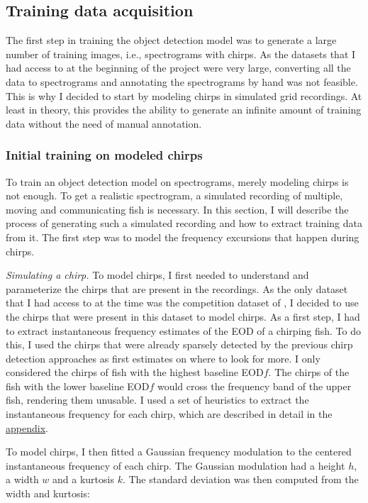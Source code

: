 \subsection{Training data acquisition}
\label{sec:dettraindata}

The first step in training the object detection model was to generate a large
number of training images, i.e., spectrograms with chirps. As the datasets that
I had access to at the beginning of the project were very large, converting all
the data to spectrograms and annotating the spectrograms by hand was not
feasible. This is why I decided to start by modeling chirps in simulated grid
recordings. At least in theory, this provides the ability to generate an
infinite amount of training data without the need of manual annotation.

\subsubsection{Initial training on modeled chirps}

To train an object detection model on spectrograms, merely modeling chirps is
not enough. To get a realistic spectrogram, a simulated recording of multiple,
moving and communicating fish is necessary. In this section, I will describe
the process of generating such a simulated recording and how to extract
training data from it. The first step was to model the frequency excursions
that happen during chirps.

\emph{Simulating a chirp.} To model chirps, I first needed to understand and
parameterize the chirps that are present in the recordings. As the only dataset
that I had access to at the time was the competition dataset of
\textcite{raabElectrocommunicationSignalsIndicate2021}, I decided to use the
chirps that were present in this dataset to model chirps. As a first step, I
had to extract instantaneous frequency estimates of the EOD of a chirping fish.
To do this, I used the chirps that were already sparsely detected by the
previous chirp detection approaches as first estimates on where to look for
more. I only considered the chirps of fish with the highest baseline EOD$f$.
The chirps of the fish with the lower baseline EOD$f$ would cross the frequency
band of the upper fish, rendering them unusable. I used a set of heuristics to
extract the instantaneous frequency for each chirp, which are described in
detail in the \hyperref[appendix]{appendix}.

To model chirps, I then fitted a Gaussian frequency modulation to the centered
instantaneous frequency of each chirp. The Gaussian modulation had a height
$h$, a width $w$ and a kurtosis $k$. The standard deviation was then computed
from the width and kurtosis:

